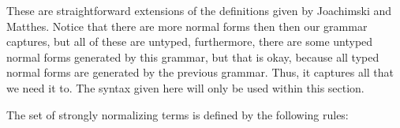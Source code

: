 These are straightforward extensions of the definitions given by
Joachimski and Matthes.  Notice that there are more normal forms then
then our grammar captures, but all of these are untyped, furthermore,
there are some untyped normal forms generated by this grammar, but
that is okay, because all typed normal forms are generated by the
previous grammar.  Thus, it captures all that we need it to.  The
syntax given here will only be used within this section.

The set of strongly normalizing terms is defined by the following
rules:
